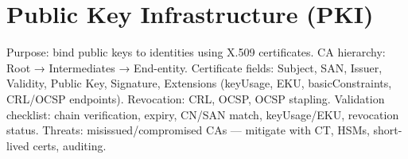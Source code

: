 \documentclass[11pt]{article}
\begin{document}
\section{Public Key Infrastructure (PKI)}
Purpose: bind public keys to identities using X.509 certificates. CA hierarchy: Root → Intermediates → End-entity. Certificate fields: Subject, SAN, Issuer, Validity, Public Key, Signature, Extensions (keyUsage, EKU, basicConstraints, CRL/OCSP endpoints). Revocation: CRL, OCSP, OCSP stapling. Validation checklist: chain verification, expiry, CN/SAN match, keyUsage/EKU, revocation status. Threats: misissued/compromised CAs — mitigate with CT, HSMs, short-lived certs, auditing.

\clearpage
\printindex
\end{document}
